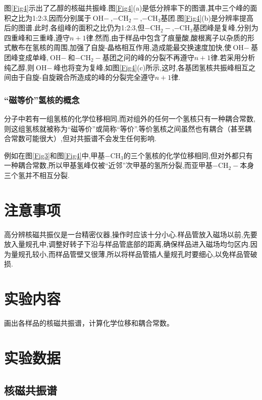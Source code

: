 \documentclass[a4paper]{article}
\begin{document}
图\ref{Fig4}示出了乙醇的核磁共振峰.图\ref{Fig4}(a)是低分辨率下的图谱,其中三个峰的面积之比为1:2:3,因而分别属于$\text{OH}-$,$-\text{CH}_2-$,$-\text{CH}_3$基团.图\ref{Fig4}(b)是分辨率提高后的图谱.此时,各组峰的面积之比仍为1:2:3,但$-\text{CH}_2-$,$-\text{CH}_3$基团峰是复峰,分别为四重峰和三重峰,遵守$n+1$律.然而,由于样品中包含了痕量酸,酸根离子以杂质的形式散布在氢核的周围,加强了自旋-晶格相互作用,造成能最交换速度加快,使$\text{OH}-$基团峰变成单峰,$\text{OH}-$和$-\text{CH}_2-$基团之问的峰的分裂不再遵守$n+1$律.若采用分析纯乙醇,则$\text{OH}-$峰也将变为复峰,如图\ref{Fig4}(c)所示,这时,各基团氢核共振峰相互之间由于自旋-自旋親合所造成的峰的分裂完全遵守$n+1$律.

\subsubsection{“磁等价”氢核的概念}

分子中若有一组氢核的化学位移相同,而对组外的任何一个氢核只有一种耦合常数,则这组氢核就被称为“磁等价”或简称“等价”.等价氢核之间虽然也有耦合（甚至耦合常数可能很大）,但对共振谱不会发生任何影响.

例如在图\ref{Fig3}和图\ref{Fig4}中,甲基$-\text{CH}_3$的三个氢核的化学位移相同,但对外都只有一种耦合常数,所以甲基氢峰仅被“近邻”次甲基的氢所分裂,而亚甲基$-\text{CH}_2-$本身三个氢并不相互分裂.

\section{注意事项}
高分辨核磁共振仪是一台精密仪器,操作时应该十分小心.样品管放入磁场以前,先要放入量规孔中,调整好转子下沿与样品管底部的距离,确保样品进入磁场均匀区内.因为量规孔较小,而样品管壁又很薄,所以将样品管插人量规孔时要细心,以免样品管破损.

\section{实验内容}
画出各样品的核磁共振谱，计算化学位移和耦合常数。

\newpage

\section{实验数据}
\subsection{核磁共振谱}
\end{document}

